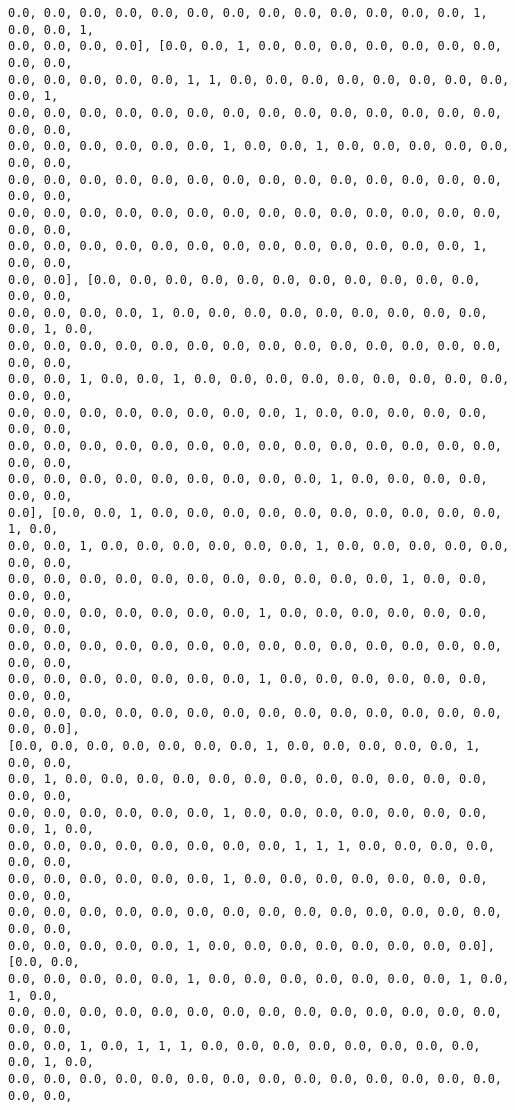 \documentclass[11pt]{article}
\begin{document}
\begin{Verbatim}[commandchars=\\\{\}]
0.0, 0.0, 0.0, 0.0, 0.0, 0.0, 0.0, 0.0, 0.0, 0.0, 0.0, 0.0, 0.0, 1, 0.0, 0.0, 1,
0.0, 0.0, 0.0, 0.0], [0.0, 0.0, 1, 0.0, 0.0, 0.0, 0.0, 0.0, 0.0, 0.0, 0.0, 0.0,
0.0, 0.0, 0.0, 0.0, 0.0, 1, 1, 0.0, 0.0, 0.0, 0.0, 0.0, 0.0, 0.0, 0.0, 0.0, 1,
0.0, 0.0, 0.0, 0.0, 0.0, 0.0, 0.0, 0.0, 0.0, 0.0, 0.0, 0.0, 0.0, 0.0, 0.0, 0.0,
0.0, 0.0, 0.0, 0.0, 0.0, 0.0, 1, 0.0, 0.0, 1, 0.0, 0.0, 0.0, 0.0, 0.0, 0.0, 0.0,
0.0, 0.0, 0.0, 0.0, 0.0, 0.0, 0.0, 0.0, 0.0, 0.0, 0.0, 0.0, 0.0, 0.0, 0.0, 0.0,
0.0, 0.0, 0.0, 0.0, 0.0, 0.0, 0.0, 0.0, 0.0, 0.0, 0.0, 0.0, 0.0, 0.0, 0.0, 0.0,
0.0, 0.0, 0.0, 0.0, 0.0, 0.0, 0.0, 0.0, 0.0, 0.0, 0.0, 0.0, 0.0, 1, 0.0, 0.0,
0.0, 0.0], [0.0, 0.0, 0.0, 0.0, 0.0, 0.0, 0.0, 0.0, 0.0, 0.0, 0.0, 0.0, 0.0,
0.0, 0.0, 0.0, 0.0, 1, 0.0, 0.0, 0.0, 0.0, 0.0, 0.0, 0.0, 0.0, 0.0, 0.0, 1, 0.0,
0.0, 0.0, 0.0, 0.0, 0.0, 0.0, 0.0, 0.0, 0.0, 0.0, 0.0, 0.0, 0.0, 0.0, 0.0, 0.0,
0.0, 0.0, 1, 0.0, 0.0, 1, 0.0, 0.0, 0.0, 0.0, 0.0, 0.0, 0.0, 0.0, 0.0, 0.0, 0.0,
0.0, 0.0, 0.0, 0.0, 0.0, 0.0, 0.0, 0.0, 1, 0.0, 0.0, 0.0, 0.0, 0.0, 0.0, 0.0,
0.0, 0.0, 0.0, 0.0, 0.0, 0.0, 0.0, 0.0, 0.0, 0.0, 0.0, 0.0, 0.0, 0.0, 0.0, 0.0,
0.0, 0.0, 0.0, 0.0, 0.0, 0.0, 0.0, 0.0, 0.0, 1, 0.0, 0.0, 0.0, 0.0, 0.0, 0.0,
0.0], [0.0, 0.0, 1, 0.0, 0.0, 0.0, 0.0, 0.0, 0.0, 0.0, 0.0, 0.0, 0.0, 1, 0.0,
0.0, 0.0, 1, 0.0, 0.0, 0.0, 0.0, 0.0, 0.0, 1, 0.0, 0.0, 0.0, 0.0, 0.0, 0.0, 0.0,
0.0, 0.0, 0.0, 0.0, 0.0, 0.0, 0.0, 0.0, 0.0, 0.0, 0.0, 1, 0.0, 0.0, 0.0, 0.0,
0.0, 0.0, 0.0, 0.0, 0.0, 0.0, 0.0, 1, 0.0, 0.0, 0.0, 0.0, 0.0, 0.0, 0.0, 0.0,
0.0, 0.0, 0.0, 0.0, 0.0, 0.0, 0.0, 0.0, 0.0, 0.0, 0.0, 0.0, 0.0, 0.0, 0.0, 0.0,
0.0, 0.0, 0.0, 0.0, 0.0, 0.0, 0.0, 1, 0.0, 0.0, 0.0, 0.0, 0.0, 0.0, 0.0, 0.0,
0.0, 0.0, 0.0, 0.0, 0.0, 0.0, 0.0, 0.0, 0.0, 0.0, 0.0, 0.0, 0.0, 0.0, 0.0, 0.0],
[0.0, 0.0, 0.0, 0.0, 0.0, 0.0, 0.0, 1, 0.0, 0.0, 0.0, 0.0, 0.0, 1, 0.0, 0.0,
0.0, 1, 0.0, 0.0, 0.0, 0.0, 0.0, 0.0, 0.0, 0.0, 0.0, 0.0, 0.0, 0.0, 0.0, 0.0,
0.0, 0.0, 0.0, 0.0, 0.0, 0.0, 1, 0.0, 0.0, 0.0, 0.0, 0.0, 0.0, 0.0, 0.0, 1, 0.0,
0.0, 0.0, 0.0, 0.0, 0.0, 0.0, 0.0, 0.0, 1, 1, 1, 0.0, 0.0, 0.0, 0.0, 0.0, 0.0,
0.0, 0.0, 0.0, 0.0, 0.0, 0.0, 1, 0.0, 0.0, 0.0, 0.0, 0.0, 0.0, 0.0, 0.0, 0.0,
0.0, 0.0, 0.0, 0.0, 0.0, 0.0, 0.0, 0.0, 0.0, 0.0, 0.0, 0.0, 0.0, 0.0, 0.0, 0.0,
0.0, 0.0, 0.0, 0.0, 0.0, 1, 0.0, 0.0, 0.0, 0.0, 0.0, 0.0, 0.0, 0.0], [0.0, 0.0,
0.0, 0.0, 0.0, 0.0, 0.0, 1, 0.0, 0.0, 0.0, 0.0, 0.0, 0.0, 0.0, 1, 0.0, 1, 0.0,
0.0, 0.0, 0.0, 0.0, 0.0, 0.0, 0.0, 0.0, 0.0, 0.0, 0.0, 0.0, 0.0, 0.0, 0.0, 0.0,
0.0, 0.0, 1, 0.0, 1, 1, 1, 0.0, 0.0, 0.0, 0.0, 0.0, 0.0, 0.0, 0.0, 0.0, 1, 0.0,
0.0, 0.0, 0.0, 0.0, 0.0, 0.0, 0.0, 0.0, 0.0, 0.0, 0.0, 0.0, 0.0, 0.0, 0.0, 0.0,

\end{Verbatim}
\end{document}
